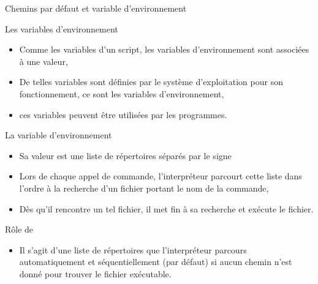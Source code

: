 \begin{frame}{Chemins par défaut et variable d'environnement}
  \begin{block}{Les variables d'environnement}
    \begin{itemize}
    \item Comme les variables d'un script, les variables d'environnement sont
      associées à une valeur,
    \item De telles variables sont définies par le système d'exploitation pour
      son fonctionnement, ce sont les variables d'environnement,
    \item ces variables peuvent être utilisées par les programmes.
    \end{itemize}
  \end{block}
  \begin{block}{La variable d'environnement }
    \begin{itemize}
    \item Sa valeur est une liste de répertoires séparés par le signe \\
      \begin{center}
      \end{center}
    \item Lors de chaque appel de commande, l'interpréteur parcourt cette
      liste dans l'ordre à la recherche d'un fichier portant le nom de la
      commande,
    \item Dès qu'il rencontre un tel fichier, il met fin à sa recherche et
      exécute le fichier.
    \end{itemize}
  \end{block}
  \begin{alertblock}{Rôle de }
    \begin{itemize}
    \item[\textrightarrow] Il s'agit d'une liste de répertoires que
      l'interpréteur parcours automatiquement et séquentiellement (par défaut)
      si aucun chemin n'est donné pour trouver le fichier exécutable.
    \end{itemize}
  \end{alertblock}
\end{frame}

